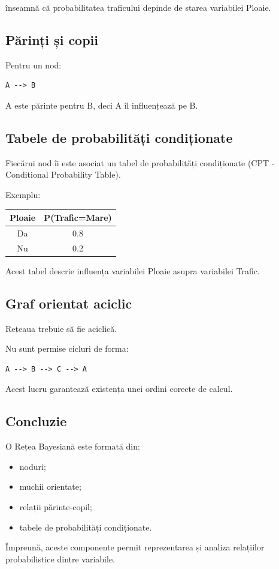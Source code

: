 \documentclass[12pt,a4paper]{article}
\begin{document}
înseamnă că probabilitatea traficului depinde de starea variabilei Ploaie.

\subsection{Părinți și copii}

Pentru un nod:

\begin{verbatim}
A --> B
\end{verbatim}

A este părinte pentru B, deci A îl influențează pe B.

\subsection{Tabele de probabilități condiționate}

Fiecărui nod îi este asociat un tabel de probabilități condiționate (CPT - Conditional Probability Table).

Exemplu:

\begin{center}
\begin{tabular}{|c|c|}
\hline
Ploaie & P(Trafic=Mare) \\
\hline
Da & 0.8 \\
Nu & 0.2 \\
\hline
\end{tabular}
\end{center}

Acest tabel descrie influența variabilei Ploaie asupra variabilei Trafic.

\subsection{Graf orientat aciclic}

Rețeaua trebuie să fie aciclică.

Nu sunt permise cicluri de forma:

\begin{verbatim}
A --> B --> C --> A
\end{verbatim}

Acest lucru garantează existența unei ordini corecte de calcul.

\subsection{Concluzie}

O Rețea Bayesiană este formată din:

\begin{itemize}
\item noduri;
\item muchii orientate;
\item relații părinte-copil;
\item tabele de probabilități condiționate.
\end{itemize}

Împreună, aceste componente permit reprezentarea și analiza relațiilor probabilistice dintre variabile.
\end{document}
